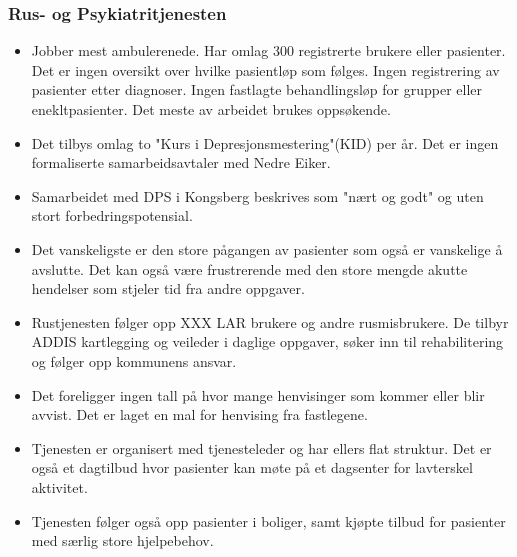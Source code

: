 \documentclass[11pt]{report} %
\begin{document}
                      \subsubsection{Rus- og Psykiatritjenesten}
                      	
                        \begin{itemize}
                    	      \item Jobber mest ambulerenede. Har omlag 300 registrerte brukere eller pasienter. Det er ingen oversikt over hvilke pasientløp som følges. Ingen registrering av pasienter etter  diagnoser. Ingen fastlagte behandlingsløp for grupper eller enekltpasienter. Det meste av arbeidet brukes oppsøkende. \\
                            \item Det tilbys omlag to "Kurs i Depresjonsmestering"(KID) per år. Det er ingen formaliserte samarbeidsavtaler med Nedre Eiker. \\
                            \item Samarbeidet med DPS i Kongsberg beskrives som "nært og godt" og uten stort forbedringspotensial.\\
                            \item Det vanskeligste er den store pågangen av pasienter som også er vanskelige å avslutte. Det kan også være frustrerende med den store mengde akutte hendelser som stjeler tid fra andre oppgaver.\\ 
                            \item Rustjenesten følger opp XXX LAR brukere og andre rusmisbrukere. De tilbyr ADDIS kartlegging og veileder i daglige oppgaver, søker inn til rehabilitering og følger opp kommunens ansvar.\\
                            \item Det foreligger ingen tall på hvor mange henvisinger som kommer eller blir avvist. Det er laget en mal for henvising fra fastlegene. \\
                            \item Tjenesten er organisert med tjenesteleder og har ellers flat struktur. Det er også et dagtilbud hvor pasienter kan møte på et dagsenter for lavterskel aktivitet. \\
                            \item Tjenesten følger også opp pasienter i boliger, samt kjøpte tilbud for pasienter med særlig store hjelpebehov. \\
                        \end{itemize}
                    
\end{document}
